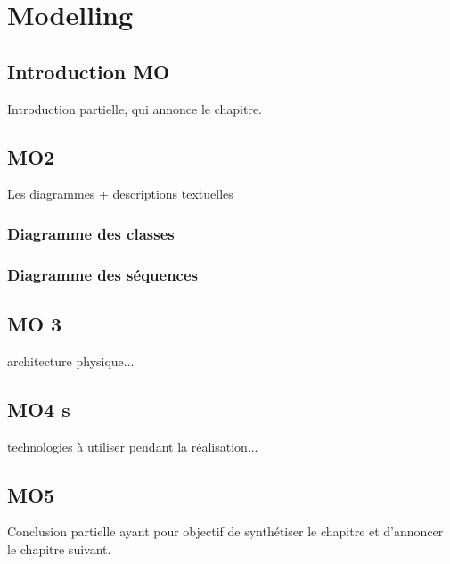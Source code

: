 \chapter{Modelling}

\section{Introduction MO}
    Introduction partielle, qui annonce  le chapitre.

\section{MO2}
    Les diagrammes + descriptions textuelles
    
    \subsection{Diagramme des classes}
        
    \subsection{Diagramme des séquences}

\section{MO 3 }
    architecture physique...
    
\section{MO4 s}
    technologies à utiliser pendant la réalisation...

\section*{MO5}
    Conclusion partielle ayant pour objectif de synthétiser le chapitre et d'annoncer le chapitre suivant.